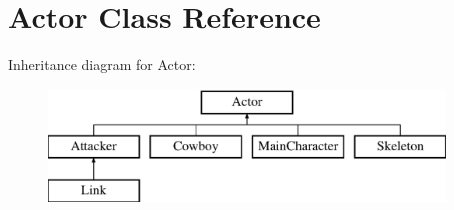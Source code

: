 \hypertarget{classActor}{}\section{Actor Class Reference}
\label{classActor}
Inheritance diagram for Actor\+:\begin{figure}[H]
\begin{center}
\leavevmode
\includegraphics[height=3.000000cm]{classActor}
\end{center}
\end{figure}
